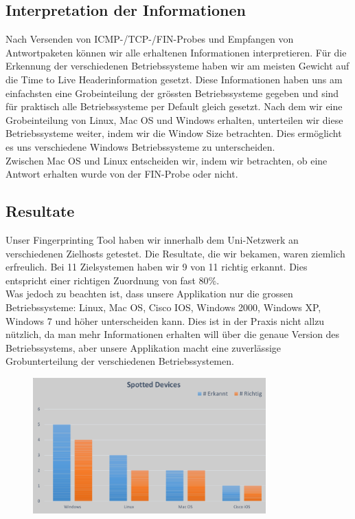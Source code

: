 \documentclass{article} %
\begin{document}
\subsection{Interpretation der Informationen}
Nach Versenden von ICMP-/TCP-/FIN-Probes und Empfangen von Antwortpaketen k\"onnen wir alle erhaltenen Informationen interpretieren. F\"ur die Erkennung der verschiedenen Betriebssysteme haben wir am meisten Gewicht auf die Time to Live Headerinformation gesetzt. Diese Informationen haben uns am einfachsten eine Grobeinteilung der gr\"ossten Betriebssysteme gegeben und sind f\"ur praktisch alle Betriebssysteme per Default gleich gesetzt. Nach dem wir eine Grobeinteilung von Linux, Mac OS und Windows erhalten, unterteilen wir diese Betriebssysteme weiter, indem wir die Window Size betrachten. Dies erm\"oglicht es uns verschiedene Windows Betriebssysteme zu unterscheiden. \\
Zwischen Mac OS und Linux entscheiden wir, indem wir betrachten, ob eine Antwort erhalten wurde von der FIN-Probe oder nicht. \\

 
\subsection{Resultate}
Unser Fingerprinting Tool haben wir innerhalb dem Uni-Netzwerk an verschiedenen Zielhosts getestet. Die Resultate, die wir bekamen, waren ziemlich erfreulich. Bei 11 Zielsystemen haben wir 9 von 11 richtig erkannt. Dies entspricht einer richtigen Zuordnung von fast 80\%.\\
Was jedoch zu beachten ist, dass unsere Applikation nur die grossen Betriebssysteme: Linux, Mac OS, Cisco IOS, Windows 2000, Windows XP, Windows 7 und h\"oher unterscheiden kann. Dies ist in der Praxis nicht allzu n\"utzlich, da man mehr Informationen erhalten will \"uber die genaue Version des Betriebssystems, aber unsere Applikation macht eine zuverl\"assige Grobunterteilung der verschiedenen Betriebssystemen.

\begin{figure}[!htb]
\begin{center}
\includegraphics[width=0.8\textwidth]{data/spotteddevices.png}
\captionsetup{singlelinecheck=off}
\label{Abb.54}
\end{center}
\end{figure}
\end{document}
